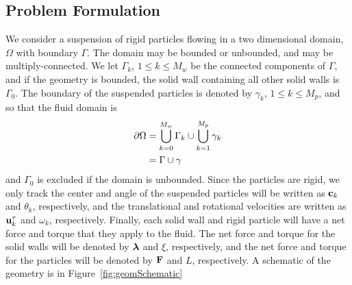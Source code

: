 \documentclass[preprint, 10pt]{elsarticle}
\begin{document}
\subsection{Problem Formulation}

We consider a suspension of rigid particles flowing in a two dimensional
domain, $\Omega$ with boundary $\Gamma$.  The domain may be bounded or
unbounded, and may be multiply-connected.  We let $\Gamma_k$, $1 \leq k
\leq M_w$ be the connected components of $\Gamma$, and if the geometry is
bounded, the solid wall containing all other solid walls is $\Gamma_0$.
The boundary of the suspended particles is denoted by $\gamma_k$, $1
\leq k \leq M_p$, and so that the fluid domain is
\begin{align*}
  {\partial}\Omega &= \bigcup_{k=0}^{M_w} \Gamma_k \cup \bigcup_{k=1}^{M_p} \gamma_k \\
  &= \Gamma \cup \gamma
\end{align*}
and $\Gamma_0$ is excluded if the domain is unbounded.  Since the
particles are rigid, we only track the center and angle of the suspended
particles will be written as ${\mathbf{c}}_k$ and $\theta_k$, respectively, and
the translational and rotational velocities are written as ${\mathbf{u}}_k^\tau$
and $\omega_k$, respectively.  Finally, each solid wall and rigid
particle will have a net force and torque that they apply to the fluid.
The net force and torque for the solid walls will be denoted by
${\boldsymbol\lambda}$ and $\xi$, respectively, and the net force and torque for the
particles will be denoted by ${\mathbf{F}}$ and $L$, respectively.  A schematic
of the geometry is in Figure~\ref{fig:geomSchematic}

%
\end{document}
